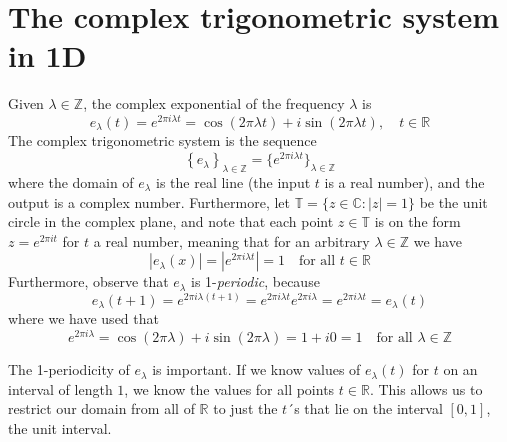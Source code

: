 \documentclass[../thesis.tex]{subfiles}
\begin{document}



\section{The complex trigonometric system in 1D}\label{sec:complx_trig_1d}

Given $\lambda \in \mathbb{Z}$, the complex exponential of the frequency $\lambda$ is 
\begin{equation}
    e_{\lambda}(t) = e^{2 \pi i \lambda t} = \cos{(2 \pi \lambda t)} + i \sin{(2 \pi \lambda t)}, \quad t\in \mathbb{R}    
\end{equation}
The complex trigonometric system is the sequence
\begin{equation}
    \left\{ e_{\lambda} \right\}_{\lambda\in \mathbb{Z}} = \{ e^{2 \pi i \lambda t} \}_{\lambda \in \mathbb{Z}}    
\end{equation}
where the domain of $e_\lambda$ is the real line (the input $t$ is a real number), and the output is a complex number. Furthermore, let $\mathbb{T}=\{z\in \mathbb{C} : |z|=1\}$ be the unit circle in the complex plane, and note that each point $z\in\mathbb{T}$ is on the form $z=e^{2 \pi i t}$ for $t$ a real number, meaning that for an arbitrary $\lambda \in \mathbb{Z}$ we have
\begin{equation}
    \left|e_{\lambda}(x) \right|= |e^{2 \pi i \lambda t} | = 1 \quad \text{for all } t\in \mathbb{R} 
\end{equation}
Furthermore, observe that $e_\lambda$ is 1-\emph{periodic}, because
\begin{equation}
    e_\lambda(t+1) = e^{2 \pi i \lambda (t+1)} = e^{2 \pi i \lambda t} e^{2 \pi i \lambda} = e^{2 \pi i \lambda t} = e_\lambda(t)
\end{equation}
where we have used that
\begin{equation}
    e^{2 \pi i \lambda} = \cos(2 \pi \lambda) + i \sin(2 \pi \lambda) = 1+i0 = 1 \quad \text{for all } \lambda \in \mathbb{Z} 
\end{equation}

The 1-periodicity of $e_\lambda$ is important. If we know values of $e_\lambda(t)$ for $t$ on an interval of length $1$, we know the values for all points $t\in \mathbb{R}$. This allows us to restrict our domain from all of $\mathbb{R}$ to just the $t$´s that lie on the interval $[0,1]$, the unit interval.
\end{document}
